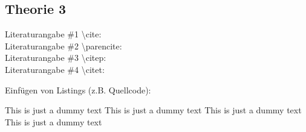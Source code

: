 \subsection{Theorie 3}
\label{sec:theorieC}

Literaturangabe \#1 \textbackslash cite: \cite{max2007company} \\
Literaturangabe \#2 \textbackslash parencite: \parencite{example2017sdk} \\
Literaturangabe \#3 \textbackslash citep: \citep{place2014art} \\
Literaturangabe \#4 \textbackslash citet: \citet{max2007company}

\bigskip

Einfügen von Listings (z.B. Quellcode):

\begin{center}
	\begin{minipage}[!h]{\textwidth}
		
	\end{minipage}
\end{center}
\bigskip

This is just a dummy text This is just a dummy text  This is just a dummy text This is just a dummy text 